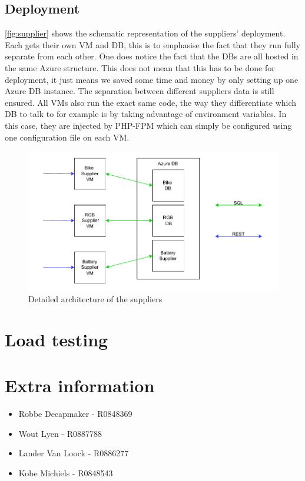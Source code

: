 \documentclass[10pt,a4paper,kul]{kulakarticle} %
\begin{document}
		\subsection{Deployment}
			\autoref{fig:supplier} shows the schematic representation of the suppliers' deployment. Each gets their own VM and DB, this is to emphasise the fact that they run fully separate from each other. One does notice the fact that the DBs are all hosted in the same Azure structure. This does not mean that this has to be done for deployment, it just means we saved some time and money by only setting up one Azure DB instance. The separation between different suppliers data is still ensured. All VMs also run the exact same code, the way they differentiate which DB to talk to for example is by taking advantage of environment variables. In this case, they are injected by PHP-FPM which can simply be configured using one configuration file on each VM. 
			\begin{figure}[h!]
				\centering
				\includegraphics[width=0.7\linewidth]{images/supplier}
				\caption{Detailed architecture of the suppliers}
				\label{fig:supplier}
			\end{figure}
		
	\section{Load testing}
	
\newpage
  \section{Extra information}
  \begin{itemize}
    \item Robbe Decapmaker - R0848369
    \item Wout Lyen - R0887788
    \item Lander Van Loock - R0886277
    \item Kobe Michiels - R0848543
  \end{itemize}
  
\end{document}
